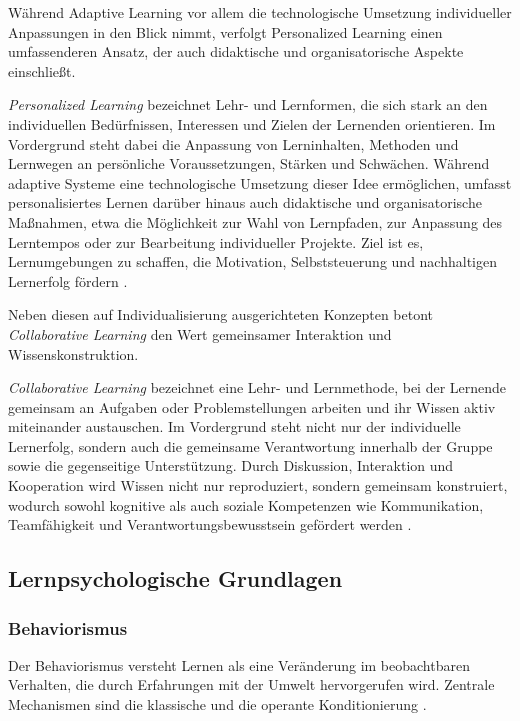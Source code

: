 Während Adaptive Learning vor allem die technologische Umsetzung individueller Anpassungen in den Blick nimmt, verfolgt Personalized Learning einen umfassenderen Ansatz, der auch didaktische und organisatorische Aspekte einschließt.

\textit{Personalized Learning} bezeichnet Lehr- und Lernformen, die sich stark an den individuellen Bedürfnissen, Interessen und Zielen der Lernenden orientieren. Im Vordergrund steht dabei die Anpassung von Lerninhalten, Methoden und Lernwegen an persönliche Voraussetzungen, Stärken und Schwächen. Während adaptive Systeme eine technologische Umsetzung dieser Idee ermöglichen, umfasst personalisiertes Lernen darüber hinaus auch didaktische und organisatorische Maßnahmen, etwa die Möglichkeit zur Wahl von Lernpfaden, zur Anpassung des Lerntempos oder zur Bearbeitung individueller Projekte. Ziel ist es, Lernumgebungen zu schaffen, die Motivation, Selbststeuerung und nachhaltigen Lernerfolg fördern \parencites[S.~6ff]{pane_informing_2017}[S.~2f]{gunawardena_personalized_2024}[S.~236--239]{walkington_appraising_2020}.

Neben diesen auf Individualisierung ausgerichteten Konzepten betont \textit{Collaborative Learning} den Wert gemeinsamer Interaktion und Wissenskonstruktion.

\textit{Collaborative Learning} bezeichnet eine Lehr- und Lernmethode, bei der Lernende gemeinsam an Aufgaben oder Problemstellungen arbeiten und ihr Wissen aktiv miteinander austauschen. Im Vordergrund steht nicht nur der individuelle Lernerfolg, sondern auch die gemeinsame Verantwortung innerhalb der Gruppe sowie die gegenseitige Unterstützung. Durch Diskussion, Interaktion und Kooperation wird Wissen nicht nur reproduziert, sondern gemeinsam konstruiert, wodurch sowohl kognitive als auch soziale Kompetenzen wie Kommunikation, Teamfähigkeit und Verantwortungsbewusstsein gefördert werden \parencite[S.~486]{laal_benefits_2021}.

\subsection{Lernpsychologische Grundlagen}

\subsubsection{Behaviorismus}

Der Behaviorismus versteht Lernen als eine Veränderung im beobachtbaren Verhalten, die durch Erfahrungen mit der Umwelt hervorgerufen wird. Zentrale Mechanismen sind die klassische und die operante Konditionierung \parencite[S.~15]{pfeiffer_simulationsumgebungen_2008}.

